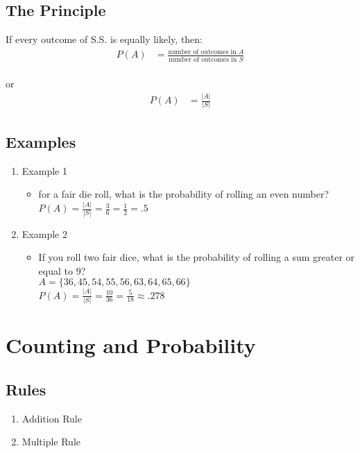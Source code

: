 \documentclass[12pt]{article}
\begin{document}
        \subsection{The Principle}
            If every outcome of S.S. is equally likely, then:
            \begin{align*}
                P(A) &= \frac{\text{number of outcomes in } A}{\text{number of outcomes in } S}
            \end{align*}
            \\or
            \begin{align*}
                P(A) &= \frac{|A|}{|S|}
            \end{align*}
        \subsection{Examples}
            \begin{enumerate}
                \item Example 1
                \begin{itemize}
                    \item for a fair die roll, what is the probability of rolling an even number?
                    \\$P (A) = \frac{|A|}{|S|} = \frac{3}{6} = \frac{1}{2} = .5$
                \end{itemize}
                \item Example 2
                \begin{itemize}
                    \item If you roll two fair dice, what is the probability of rolling a sum greater or equal to $9$?
                    \\$A = \{36, 45, 54, 55, 56, 63, 64, 65, 66\}$
                    \\$P (A) = \frac{|A|}{|S|} = \frac{10}{36} = \frac{5}{18} \approx{} .278$
                \end{itemize}
            \end{enumerate}
    \section{Counting and Probability}
        \subsection{Rules}
            \begin{enumerate}
                \item Addition Rule
                \item Multiple Rule
            \end{enumerate}
\end{document}
